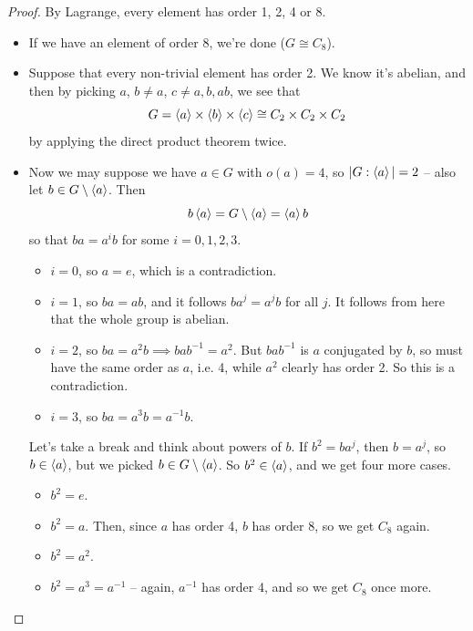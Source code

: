 \documentclass{../template/note}
\begin{document}
    \begin{proof}
        By Lagrange, every element has order 1, 2, 4 or 8.
        \begin{itemize}
            \item If we have an element of order 8, we're done (\(G \cong C_8\)).
            \item Suppose that every non-trivial element has order 2. We know it's abelian, and then by picking \(a\), \(b \neq a\), \(c \neq a, b, ab\), we see that
            \[
                G = \left \langle a \right \rangle \times \left \langle b \right \rangle \times \left \langle c \right \rangle \cong C_2 \times C_2 \times C_2
            \]
            by applying the direct product theorem twice.
            \item Now we may suppose we have \(a \in G\) with \(o(a) = 4\), so \(|G: \left \langle a \right \rangle| = 2\) -- also let \(b \in G \setminus \left \langle a \right \rangle\). Then
            \[
                b \left \langle a \right \rangle = G \setminus \left \langle a \right \rangle = \left \langle a \right \rangle b
            \]
            so that \(ba = a^ib\) for some \(i = 0, 1, 2, 3\).
            \begin{itemize}
                \item \(i = 0\), so \(a = e\), which is a contradiction.
                \item \(i = 1\), so \(ba = ab\), and it follows \(ba^j = a^jb\) for all \(j\). It follows from here that the whole group is abelian.
                \item \(i = 2\), so \(ba = a^2b \implies bab^{-1} = a^2\). But \(bab^{-1}\) is \(a\) conjugated by \(b\), so must have the same order as \(a\), i.e. 4, while \(a^2\) clearly has order 2. So this is a contradiction.
                \item \(i = 3\), so \(ba = a^3 b = a^{-1} b\).
            \end{itemize}
            Let's take a break and think about powers of \(b\). If \(b^2 = ba^j\), then \(b = a^j\), so \(b \in \left \langle a \right \rangle\), but we picked \(b \in G \setminus \left \langle a \right \rangle\). So \(b^2 \in \left \langle a \right \rangle\), and we get four more cases.
            \begin{itemize}
                \item \(b^2 = e\).
                \item \(b^2 = a\). Then, since \(a\) has order 4, \(b\) has order 8, so we get \(C_8\) again.
                \item \(b^2 = a^2\).
                \item \(b^2 = a^3 = a^{-1}\) -- again, \(a^{-1}\) has order 4, and so we get \(C_8\) once more.
            \end{itemize}

\end{itemize}
\end{proof}
\end{document}
